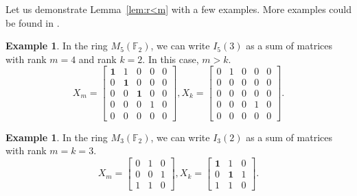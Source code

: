 \documentclass[12pt, a4paper]{amsart}
\theoremstyle{definition}
\newtheorem{expl}[thm]{Example}
\numberwithin{equation}{section}
\newcommand{\F}{\mathbb{F}}
\begin{document}
Let us demonstrate Lemma~\ref{lem:r<m} with a few examples. More examples could be found in \cite{githubrepo}.
\begin{expl}
    In the ring $M_5(\F_2)$, we can write $I_5(3)$ as a sum of matrices with rank $m=4$ and rank $k=2$. In this case, $m>k$.
    \[
    X_m =
    \begin{bmatrix}
        \mathbf{1} & 1 & 0 & 0 & 0\\
        0 & \mathbf{1} & 0 & 0 & 0\\
        0 & 0 & \mathbf{1} & 0 & 0\\
        0 & 0 & 0 & 1 & 0\\
        0 & 0 & 0 & 0 & 0
    \end{bmatrix},
    X_k =
    \begin{bmatrix}
        0 & 1 & 0 & 0 & 0\\
        0 & 0 & 0 & 0 & 0\\
        0 & 0 & 0 & 0 & 0\\
        0 & 0 & 0 & 1 & 0\\
        0 & 0 & 0 & 0 & 0
    \end{bmatrix}.
    \]
\end{expl}
\begin{expl}
    In the ring $M_3(\F_2)$, we can write $I_3(2)$ as a sum of matrices with rank $m=k=3$.
    \[
    X_m =
    \begin{bmatrix}
        0 & 1 & 0\\
        0 & 0 & 1\\
        1 & 1 & 0
    \end{bmatrix},
    X_k =
    \begin{bmatrix}
        \mathbf{1} & 1 & 0\\
        0 & \mathbf{1} & 1\\
        1 & 1 & 0
    \end{bmatrix}.
    \]
\end{expl}
\end{document}
